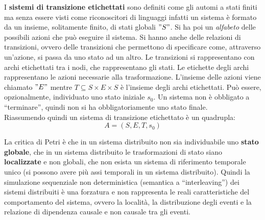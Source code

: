 \begin{definizione}
  I \textbf{sistemi di transizione etichettati} sono definiti come gli automi a
  stati finiti ma senza essere visti come riconoscitori di linguaggi infatti un
  sistema è formato da un insieme, solitamente finito, di stati globali $"S"$. Si
  ha poi un \textit{alfabeto} delle possibili azioni che può eseguire il
  sistema. Si hanno anche delle relazioni di transizioni, ovvero delle
  transizioni che permettono di specificare come, attraverso un'azione, si passa
  da uno stato ad un altro. Le transizioni si rappresentano con archi
  etichettati tra i nodi, che rappresentano 
  gli stati. Le etichette degli archi rappresentano le azioni necessarie alla
  trasformazione. L'insieme delle azioni viene chiamato $"E"$ mentre $T\subseteq
  S\times E\times S$ è l'insieme degli archi etichettati. Può essere,
  opzionalmente, individuato uno stato iniziale $s_0$. Un sistema non è
  obbligato a ``terminare'', quindi non si ha obbligatoriamente uno stato
  finale.\\ 
  Riassumendo quindi un sistema di transizione etichettato è un quadrupla:
  \[A=(S, E, T, s_0)\]
\end{definizione} \vspace{5mm} %
La critica di Petri è che in un sistema distribuito non sia individuabile uno
\textbf{stato globale}, che in un sistema distribuito le trasformazioni di stato
siano \textbf{localizzate} e non globali, che non esista un sistema di
riferimento temporale unico (si possono avere più assi temporali in un sistema
distribuito). Quindi la simulazione sequenziale non deterministica (semantica a
``interleaving'') dei sistemi distribuiti è una forzatura e non rappresenta le
reali caratteristiche del comportamento del sistema, ovvero la località, la
distribuzione degli eventi e la relazione di dipendenza causale e non causale
tra gli eventi.
